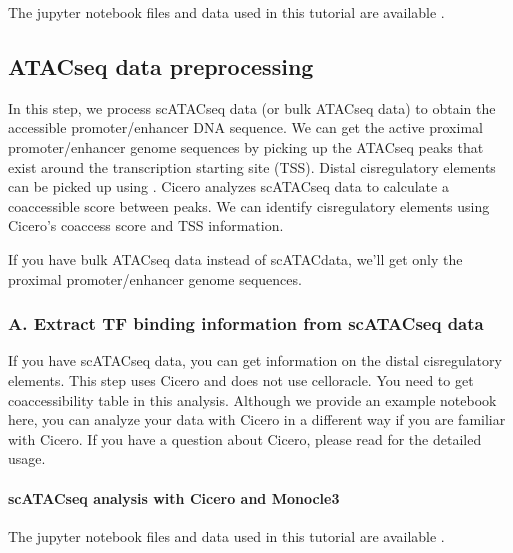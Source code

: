 \documentclass[letterpaper,10pt,english]{sphinxmanual}
\begin{document}
The jupyter notebook files and data used in this tutorial are available  .


\subsection{ATAC\sphinxhyphen{}seq data preprocessing}
\label{\detokenize{tutorials/atac:atac-seq-data-preprocessing}}\label{\detokenize{tutorials/atac:atac}}\label{\detokenize{tutorials/atac::doc}}
In this step, we process scATAC\sphinxhyphen{}seq data (or bulk ATAC\sphinxhyphen{}seq data) to obtain the accessible promoter/enhancer DNA sequence.
We can get the active proximal promoter/enhancer genome sequences by picking up the ATAC\sphinxhyphen{}seq peaks that exist around the transcription starting site (TSS).
Distal cis\sphinxhyphen{}regulatory elements can be picked up using   .
Cicero analyzes scATAC\sphinxhyphen{}seq data to calculate a co\sphinxhyphen{}accessible score between peaks.
We can identify cis\sphinxhyphen{}regulatory elements using Cicero’s co\sphinxhyphen{}access score and TSS information.

If you have bulk ATAC\sphinxhyphen{}seq data instead of scATAC\sphinxhyphen{}data, we’ll get only the proximal promoter/enhancer genome sequences.


\subsubsection{A. Extract TF binding information from scATAC\sphinxhyphen{}seq data}
\label{\detokenize{tutorials/atac:a-extract-tf-binding-information-from-scatac-seq-data}}
If you have scATAC\sphinxhyphen{}seq data, you can get information on the distal cis\sphinxhyphen{}regulatory elements.
This step uses Cicero and does not use celloracle.
You need to get co\sphinxhyphen{}accessibility table in this analysis.
Although we provide an example notebook here, you can analyze your data with Cicero in a different way if you are familiar with Cicero.
If you have a question about Cicero, please read  for the detailed usage.


\paragraph{scATAC\sphinxhyphen{}seq analysis with Cicero and Monocle3}
\label{\detokenize{tutorials/atac:scatac-seq-analysis-with-cicero-and-monocle3}}
The jupyter notebook files and data used in this tutorial are available  .
\end{document}
